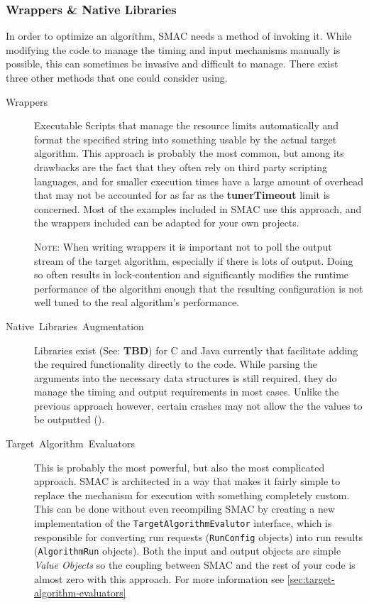 \documentclass[manual.tex]{subfiles}
\begin{document}
\subsubsection{Wrappers \& Native Libraries}
\label{sec:exec-options}
In order to optimize an algorithm, SMAC needs a method of invoking it. While modifying the code
to manage the timing and input mechanisms manually is possible, this can sometimes be invasive and difficult to manage. There exist three other methods that one could consider using.

\begin{description}
\item [{Wrappers}] Executable Scripts that manage the resource limits automatically
and format the specified string into something usable by the actual
target algorithm. This approach is probably the most common, but among
its drawbacks are the fact that they often rely on third party scripting languages,
and for smaller execution times have a large amount of overhead that
may not be accounted for as far as the \textbf{tunerTimeout} limit is concerned. Most of the examples included in SMAC use this approach, and the wrappers included can be adapted for your own
projects.

\textsc{Note:} When writing wrappers it is important not to poll the output stream of the target algorithm, especially if there is lots of output. Doing so often results in lock-contention and significantly modifies the runtime performance of the algorithm enough that the resulting configuration is not well tuned to the real algorithm's performance.

\item [{Native~Libraries~Augmentation}] Libraries exist (See: \textbf{TBD}) for C and Java currently that facilitate adding the required functionality directly to the code. While
parsing the arguments into the necessary data structures is still required, they do manage the timing and output requirements in most cases. Unlike the previous approach however, certain crashes may not allow the the values to be outputted ().

\item [{Target~Algorithm~Evaluators}]	This is probably the most powerful, but also the most complicated approach. SMAC is architected in a way that makes it fairly simple to replace the mechanism for execution with something completely custom. This can be done without even recompiling SMAC by creating a new implementation of the \texttt{TargetAlgorithmEvalutor} interface, which is responsible for converting run requests (\texttt{RunConfig} objects) into run results (\texttt{AlgorithmRun} objects). Both the input and output objects are simple \emph{Value Objects} so the coupling between SMAC and the rest of your code is almost zero with this approach.  For more information see \ref{sec:target-algorithm-evaluators}

\end{description}
\end{document}
